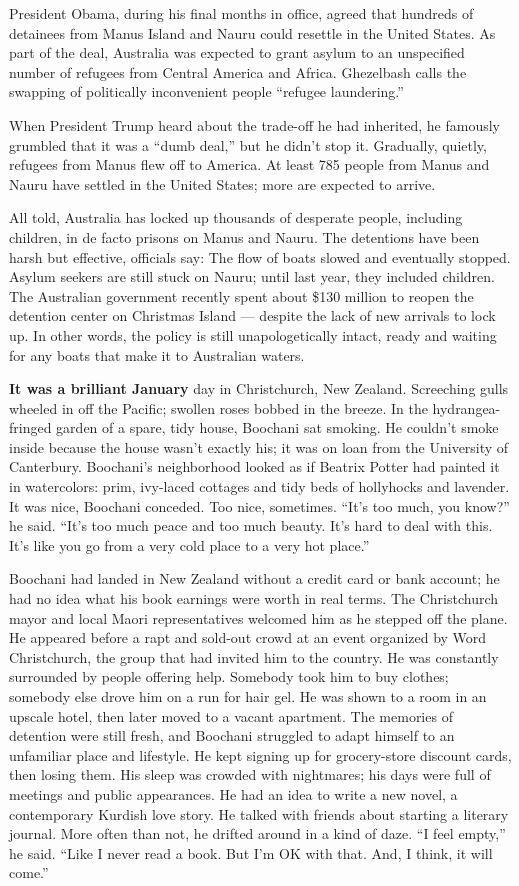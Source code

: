 President Obama, during his final months in office, agreed that hundreds
of detainees from Manus Island and Nauru could resettle in the United
States. As part of the deal, Australia was expected to grant asylum to
an unspecified number of refugees from Central America and Africa.
Ghezelbash calls the swapping of politically inconvenient people
``refugee laundering.''

When President Trump heard about the trade-off he had inherited, he
famously grumbled that it was a ``dumb deal,'' but he didn't stop it.
Gradually, quietly, refugees from Manus flew off to America. At least
785 people from Manus and Nauru have settled in the United States; more
are expected to arrive.

All told, Australia has locked up thousands of desperate people,
including children, in de facto prisons on Manus and Nauru. The
detentions have been harsh but effective, officials say: The flow of
boats slowed and eventually stopped. Asylum seekers are still stuck on
Nauru; until last year, they included children. The Australian
government recently spent about \$130 million to reopen the detention
center on Christmas Island --- despite the lack of new arrivals to lock
up. In other words, the policy is still unapologetically intact, ready
and waiting for any boats that make it to Australian waters.

\textbf{It was a brilliant January} day in Christchurch, New Zealand.
Screeching gulls wheeled in off the Pacific; swollen roses bobbed in the
breeze. In the hydrangea-fringed garden of a spare, tidy house, Boochani
sat smoking. He couldn't smoke inside because the house wasn't exactly
his; it was on loan from the University of Canterbury. Boochani's
neighborhood looked as if Beatrix Potter had painted it in watercolors:
prim, ivy-laced cottages and tidy beds of hollyhocks and lavender. It
was nice, Boochani conceded. Too nice, sometimes. ``It's too much, you
know?'' he said. ``It's too much peace and too much beauty. It's hard to
deal with this. It's like you go from a very cold place to a very hot
place.''

Boochani had landed in New Zealand without a credit card or bank
account; he had no idea what his book earnings were worth in real terms.
The Christchurch mayor and local Maori representatives welcomed him as
he stepped off the plane. He appeared before a rapt and sold-out crowd
at an event organized by Word Christchurch, the group that had invited
him to the country. He was constantly surrounded by people offering
help. Somebody took him to buy clothes; somebody else drove him on a run
for hair gel. He was shown to a room in an upscale hotel, then later
moved to a vacant apartment. The memories of detention were still fresh,
and Boochani struggled to adapt himself to an unfamiliar place and
lifestyle. He kept signing up for grocery-store discount cards, then
losing them. His sleep was crowded with nightmares; his days were full
of meetings and public appearances. He had an idea to write a new novel,
a contemporary Kurdish love story. He talked with friends about starting
a literary journal. More often than not, he drifted around in a kind of
daze. ``I feel empty,'' he said. ``Like I never read a book. But I'm OK
with that. And, I think, it will come.''

